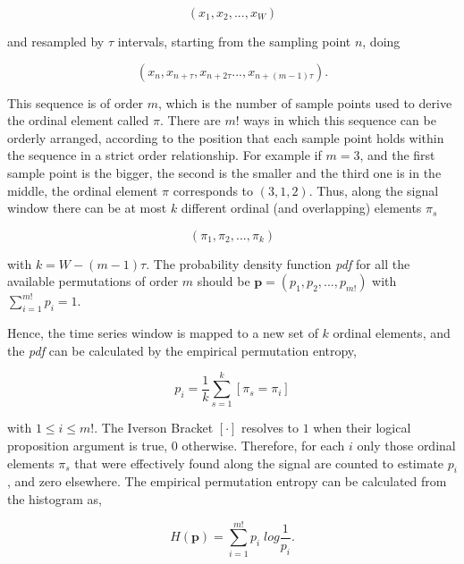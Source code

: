 \begin{equation}
(x_1,x_2,...,x_{W})
\label{eq:pesignal}
\end{equation}

\noindent and resampled by $\tau$ intervals, starting from the sampling point $n$, doing

\begin{equation}
(x_n,x_{n+\tau},x_{n+2 \tau}...,x_{n+(m-1)\tau}).
\label{eq:pe2}
\end{equation}

This sequence is of order $m$, which is the number of sample points used to derive the ordinal element called $\pi$. There are $m!$ ways in which this sequence can be orderly arranged, according to the position that each sample point holds within the sequence in a strict order relationship.  For example if $m=3$, and the first sample point is the bigger, the second is the smaller and the third one is in the middle, the ordinal element $\pi$ corresponds to $(3,1,2)$. Thus, along the signal window there can be at most $k$ different ordinal (and overlapping) elements $\pi_{s}$

\begin{equation}
(\pi_{1},\pi_{2},...,\pi_{k})
\label{eq:pe3}
\end{equation}

\noindent with $k = W-(m-1) \tau$.  The probability density function \textit{pdf} for all the available permutations of order $m$ should be $ \textbf{p} = (p_1,p_2,...,p_{m!}) $ with $ \sum_{i=1}^{m!} p_{i} = 1 $.

Hence, the time series window is mapped to a new set of $k$ ordinal elements, and the \textit{pdf} can be calculated by the empirical permutation entropy,

\begin{equation}
p_i = \frac{1}{k} \sum_{s=1}^{k} \left[ \pi_{s} = \pi_{i} \right]
\label{eq:pe4}
\end{equation}

\noindent with $1 \leq i \leq m!$. The Iverson Bracket $ \left[ \cdot \right] $ resolves to $1$ when their logical proposition argument is true, $0$ otherwise. Therefore, for each $i$ only those ordinal elements $\pi_{s}$ that were effectively found along the signal are counted to estimate $p_i$, and zero elsewhere.  The empirical permutation entropy can be calculated from the histogram as,

\begin{equation}
H(\textbf{p}) = \sum_{i=1}^{m!} p_{i} \; log \frac{1}{p_{i}}.
\label{eq:pe5}
\end{equation}

